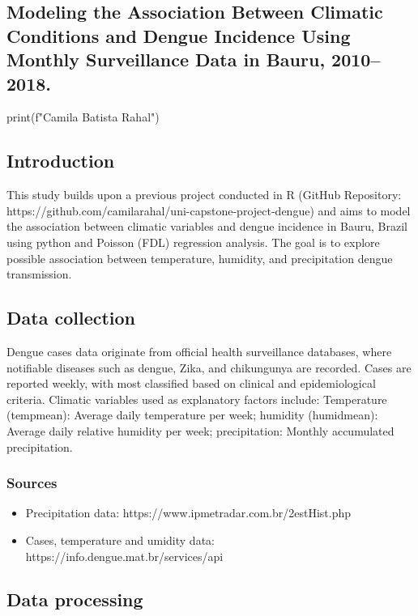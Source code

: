 \documentclass{article}
\begin{document}
\begin{center}
\section*{Modeling the Association Between Climatic Conditions and Dengue Incidence Using Monthly Surveillance Data in Bauru, 2010–2018.}

\begin{pycode}
print(f"Camila Batista Rahal")
\end{pycode}
\end{center}

\subsection*{Introduction}
This study builds upon a previous project conducted in R (GitHub Repository: https://github.com/camilarahal/uni-capstone-project-dengue) and aims to model the association between climatic variables and dengue incidence in Bauru, Brazil using python and Poisson (FDL) regression analysis. The goal is to explore possible association between temperature, humidity, and precipitation  dengue transmission.


\subsection*{Data collection}
Dengue cases data originate from official health surveillance databases, where notifiable diseases such as dengue, Zika, and chikungunya are recorded. Cases are reported weekly, with most classified based on clinical and epidemiological criteria. Climatic variables used as explanatory factors include: Temperature (tempmean): Average daily temperature per week; humidity (humidmean): Average daily relative humidity per week; precipitation: Monthly accumulated precipitation.

\subsubsection*{Sources}

\begin{itemize}
    \item Precipitation data: https://www.ipmetradar.com.br/2estHist.php
    \item Cases, temperature and umidity data: https://info.dengue.mat.br/services/api
\end{itemize}

\subsection*{Data processing}
\end{document}
